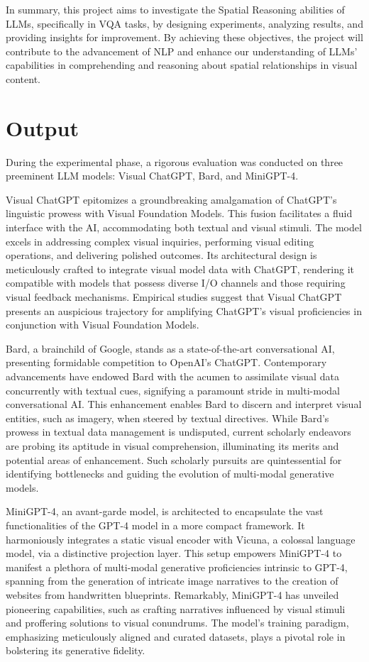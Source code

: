 \documentclass[journal,10pt]{IEEEtran}
\begin{document}
In summary, this project aims to investigate the Spatial Reasoning abilities of LLMs, specifically in VQA tasks, by designing experiments, analyzing results, and providing insights for improvement. By achieving these objectives, the project will contribute to the advancement of NLP and enhance our understanding of LLMs' capabilities in comprehending and reasoning about spatial relationships in visual content.

\section{Output}
During the experimental phase, a rigorous evaluation was conducted on three preeminent LLM models: Visual ChatGPT\cite{wu2023visual}, Bard, and MiniGPT-4\cite{zhu2023minigpt4}.

Visual ChatGPT epitomizes a groundbreaking amalgamation of ChatGPT's linguistic prowess with Visual Foundation Models. This fusion facilitates a fluid interface with the AI, accommodating both textual and visual stimuli. The model excels in addressing complex visual inquiries, performing visual editing operations, and delivering polished outcomes. Its architectural design is meticulously crafted to integrate visual model data with ChatGPT, rendering it compatible with models that possess diverse I/O channels and those requiring visual feedback mechanisms. Empirical studies suggest that Visual ChatGPT presents an auspicious trajectory for amplifying ChatGPT's visual proficiencies in conjunction with Visual Foundation Models\cite{wu2023visual}.

Bard, a brainchild of Google, stands as a state-of-the-art conversational AI, presenting formidable competition to OpenAI's ChatGPT. Contemporary advancements have endowed Bard with the acumen to assimilate visual data concurrently with textual cues, signifying a paramount stride in multi-modal conversational AI. This enhancement enables Bard to discern and interpret visual entities, such as imagery, when steered by textual directives. While Bard's prowess in textual data management is undisputed, current scholarly endeavors are probing its aptitude in visual comprehension, illuminating its merits and potential areas of enhancement. Such scholarly pursuits are quintessential for identifying bottlenecks and guiding the evolution of multi-modal generative models\cite{qin2023good}.

MiniGPT-4, an avant-garde model, is architected to encapsulate the vast functionalities of the GPT-4 model in a more compact framework. It harmoniously integrates a static visual encoder with Vicuna, a colossal language model, via a distinctive projection layer. This setup empowers MiniGPT-4 to manifest a plethora of multi-modal generative proficiencies intrinsic to GPT-4, spanning from the generation of intricate image narratives to the creation of websites from handwritten blueprints. Remarkably, MiniGPT-4 has unveiled pioneering capabilities, such as crafting narratives influenced by visual stimuli and proffering solutions to visual conundrums. The model's training paradigm, emphasizing meticulously aligned and curated datasets, plays a pivotal role in bolstering its generative fidelity\cite{zhu2023minigpt4}.
\end{document}
